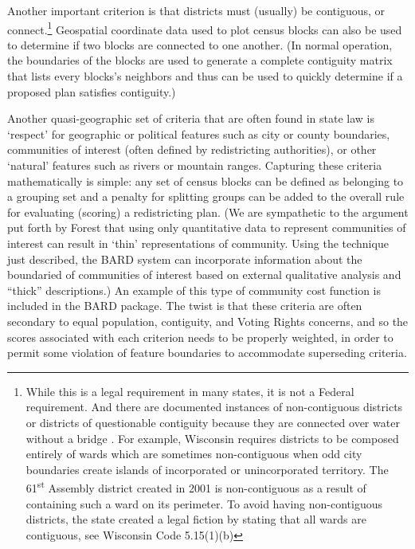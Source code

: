 \documentclass[article]{JSSstyle/jss}
\begin{document}
Another important criterion is that districts must (usually) be contiguous, or 
connect.\footnote{While this is  a legal requirement in many states, it is
not a Federal requirement. And there 
are documented instances of non-contiguous districts or districts of 
questionable contiguity because they are connected over water 
without a bridge \citep[][]{Altman98}.  For example, Wisconsin 
requires districts to be composed entirely of wards which are 
sometimes non-contiguous when odd city boundaries create islands of 
incorporated or unincorporated territory.  The 61\textsuperscript{st} Assembly district created in 2001 is non-contiguous 
as a result of containing such a ward on its perimeter.  To 
avoid having non-contiguous districts, the state created a legal 
fiction by stating that all wards are contiguous, see Wisconsin Code 5.15(1)(b)}   
Geospatial coordinate data used to plot census blocks can also be used to determine if two 
blocks are connected to one another.  (In normal operation,
the boundaries of the blocks are used to generate a complete contiguity matrix that  
lists every blocks's neighbors and thus can be used to quickly determine if 
a proposed plan satisfies contiguity.)

Another quasi-geographic set of criteria that are often found in state law is  
`respect' for geographic or political features such as city or county 
boundaries, communities of interest (often defined by redistricting 
authorities), or other `natural'  features such as rivers or mountain ranges.  Capturing  these criteria mathematically is simple: any set 
of census blocks can be defined as belonging to a grouping set and
a penalty for splitting groups can be added to the overall rule for evaluating (scoring) a redistricting plan.
(We are sympathetic to the argument put forth by Forest \citep[][]{Forest04} 
that using only quantitative data to represent communities of interest can result
in `thin' representations of community. Using the technique just described, the BARD system can incorporate
information about the boundaried of communities of interest based on external qualitative analysis and ``thick'' descriptions.) 
An example of this type of community cost function is included in the BARD package.  
The twist is that these criteria are often secondary to equal 
population, contiguity, and Voting Rights concerns, and so the scores
associated with each criterion needs to be properly weighted, in order to
 permit some violation of feature boundaries to 
accommodate superseding criteria.
\end{document}
